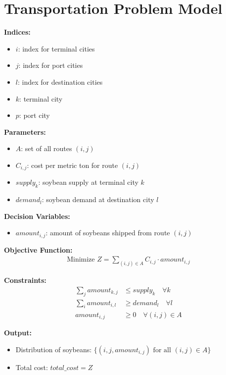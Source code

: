 \documentclass{article}
\begin{document}
\section*{Transportation Problem Model}

\textbf{Indices:}
\begin{itemize}
    \item $i$: index for terminal cities
    \item $j$: index for port cities
    \item $l$: index for destination cities
    \item $k$: terminal city
    \item $p$: port city
\end{itemize}

\textbf{Parameters:}
\begin{itemize}
    \item $A$: set of all routes $(i,j)$
    \item $C_{i,j}$: cost per metric ton for route $(i,j)$
    \item $supply_{k}$: soybean supply at terminal city $k$
    \item $demand_{l}$: soybean demand at destination city $l$
\end{itemize}

\textbf{Decision Variables:}
\begin{itemize}
    \item $amount_{i,j}$: amount of soybeans shipped from route $(i,j)$
\end{itemize}

\textbf{Objective Function:}
\begin{align*}
    \text{Minimize } Z = \sum_{(i,j) \in A} C_{i,j} \cdot amount_{i,j}
\end{align*}

\textbf{Constraints:}
\begin{align*}
    \sum_{j} amount_{k,j} & \leq supply_{k} \quad \forall k \\
    \sum_{i} amount_{i,l} & \geq demand_{l} \quad \forall l \\
    amount_{i,j} & \geq 0 \quad \forall (i,j) \in A
\end{align*}

\textbf{Output:}
\begin{itemize}
    \item Distribution of soybeans: $\{(i, j, amount_{i,j}) \text{ for all } (i,j) \in A\}$
    \item Total cost: $total\_cost = Z$
\end{itemize}
\end{document}
